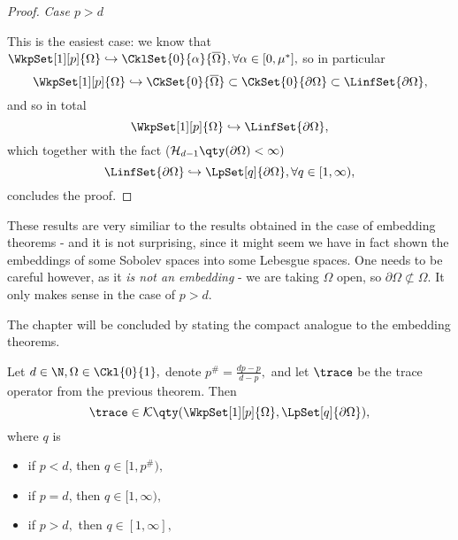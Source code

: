 \begin{proof}
	\textit{Case $p>d$}

	This is the easiest case: we know that $\WkpSet[1][p]{\Omega} \hookrightarrow \CklSet{0}{\alpha}{\overline{\Omega}}, \forall \alpha \in [0,\mu^{*}],$ so in particular
	\[
		\WkpSet[1][p]{\Omega} \hookrightarrow \CkSet{0}{\overline{\Omega}} \subset \CkSet{0}{\partial \Omega} \subset \LinfSet{\partial \Omega},
	\]
	and so in total
	\[
		\WkpSet[1][p]{\Omega} \hookrightarrow \LinfSet{\partial \Omega},
	\]
	which together with the fact ($\mathcal{H}_{d-1}\qty(\partial \Omega) < \infty)$
	\[
		\LinfSet{\partial \Omega} \hookrightarrow \LpSet[q]{\partial \Omega}, \forall q \in [1, \infty),
	\]
	concludes the proof.
\end{proof}

\begin{remark}
	These results are very similiar to the results obtained in the case of embedding theorems - and it is not surprising, since it might seem we have in fact shown the embeddings of some Sobolev spaces into some Lebesgue spaces. One needs to be careful however, as it \textit{is not an embedding} - we are taking $\Omega$ open, so $\partial \Omega \not \subset \Omega.$ It only makes sense in the case of $p > d.$
\end{remark}
The chapter will be concluded by stating the compact analogue to the embedding theorems.


\begin{theorem}
    Let $d \in \N, \Omega \in \Ckl{0}{1},$ denote $p^{\#} = \frac{dp-p}{d-p},$ and let $\trace$ be the trace operator from the previous theorem. Then
    \[
	    \trace \in \mathcal{K}\qty(\WkpSet[1][p]{\Omega}, \LpSet[q]{\partial \Omega}),
    \]
    where $q$ is
\begin{itemize}
	\item if $p < d$, then $q \in [1, p^{\#}),$
	\item if $p = d$, then $q \in [1, \infty),$
	\item if $p > d,$ then $q \in [1, \infty],$
\end{itemize}
\end{theorem}

